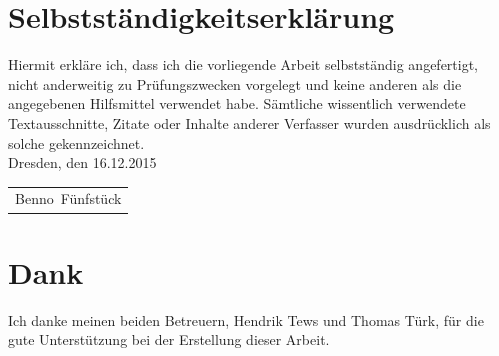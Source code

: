 \documentclass[a4paper, parskip]{scrartcl}
\begin{document}
\cleardoublepage

\section*{Selbstständigkeitserklärung}

Hiermit erkläre ich, dass ich die vorliegende Arbeit
selbstständig angefertigt, nicht anderweitig zu Prüfungszwecken vorgelegt und
keine anderen als die angegebenen Hilfsmittel verwendet habe. Sämtliche 
wissentlich verwendete Textausschnitte, Zitate oder Inhalte anderer Verfasser 
wurden ausdrücklich als solche gekennzeichnet.\\[2ex]
Dresden, den 16.12.2015\\[6ex]
\flushleft
\newlength\us
\settowidth{\us}{-Benno~Fünfstück-}
\begin{tabular}{p{\us}}\hline
\centering\footnotesize Benno~Fünfstück
\end{tabular}

\pagebreak

\section*{Dank}
Ich danke meinen beiden Betreuern, Hendrik Tews und Thomas Türk, für die gute Unterstützung bei der Erstellung dieser
Arbeit. 
\end{document}
